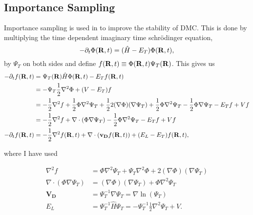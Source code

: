 \subsection*{Importance Sampling}
Importance sampling is used in \cite{foulkes2001} to improve the stability of DMC. This is done by multiplying the time dependent imaginary time schr\"odinger equation,
\begin{equation}
  -\partial_t \Phi(\mathbf{R},t) = (\hat{H}-E_T) \Phi(\mathbf{R},t),
\end{equation}
by $\Psi_T$ on both sides and define $f(\mathbf{R},t) \equiv \Phi(\mathbf{R},t) \Psi_T(\mathbf{R})$. This gives us
\begin{equation}
  \begin{split}
    -\partial_t f(\mathbf{R},t) &= \Psi_T(\mathbf{R}) \hat{H} \Phi(\mathbf{R},t) -E_T f(\mathbf{R},t) \\
    &= -\Psi_T \frac{1}{2} \nabla^2 \Phi + (V-E_T)f \\
    &= -\frac{1}{2}\nabla^2f + \frac{1}{2}\Phi\nabla^2\Psi_T + \frac{1}{2}2(\nabla\Phi)(\nabla\Psi_T) + \frac{1}{2}\Phi\nabla^2\Psi_T - \frac{1}{2}\Phi\nabla\Psi_T - E_Tf + Vf \\
    &= -\frac{1}{2}\nabla^2f + \nabla \cdot (\Phi\nabla\Psi_T) - \frac{1}{2}\Phi\nabla^2\Psi_T-E_Tf+Vf \\
    -\partial_t f(\mathbf{R},t) &= -\frac{1}{2}\nabla^2f(\mathbf{R},t) + \nabla \cdot (\mathbf{v_D}f(\mathbf{R},t)) + (E_L-E_T)f(\mathbf{R},t),
  \end{split}
\end{equation}

where I have used

\begin{equation}
  \begin{split}
    \nabla^2f &= \Phi\nabla^2\Psi_T + \Psi_T\nabla^2\Phi + 2(\nabla\Phi)(\nabla\Psi_T) \\
    \nabla\cdot(\Phi\nabla\Psi_T) &= (\nabla\Phi)(\nabla\Psi_T) + \Phi\nabla^2\Psi_T \\
    \mathbf{V_D} &= \Psi_T^{-1}\nabla\Psi_T = \nabla \ln(\Psi_T) \\
    E_L &= \Psi_T^{-1}\hat{H}\Psi_T = -\Psi_T^{-1}\frac{1}{2}\nabla^2\Psi_T + V.
  \end{split}
\end{equation}

